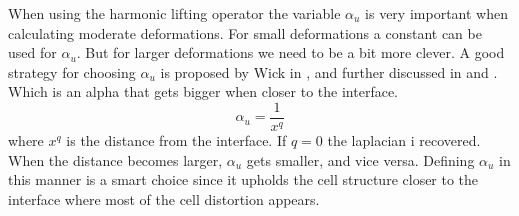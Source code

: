 When using the harmonic lifting operator the variable $\alpha_u$ is very important when calculating moderate deformations. For small deformations a constant can be used for $\alpha_u$. But for larger deformations we need to be a bit more clever. A good strategy for choosing $\alpha_u$ is proposed by Wick in \cite{Wick2011a}, and further discussed in \cite{Stein2003} and \cite{MM2016}. Which is an alpha that gets bigger when closer to the interface. 
\begin{equation}
\alpha_u = \frac{1}{x^q}
\end{equation}
where $x^q$ is the distance from the interface. If $q=0$ the laplacian i recovered. When the distance becomes larger, $\alpha_u$ gets smaller, and vice versa. 
Defining $\alpha_u$ in this manner is a smart choice since it upholds the cell structure closer to the interface where most of the cell distortion appears. 

